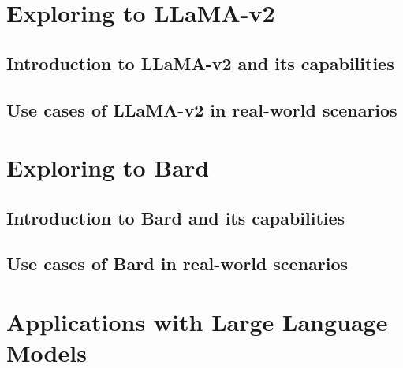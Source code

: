 \documentclass[
]{book}
\begin{document}
\hypertarget{exploring-to-llama-v2}{%
\chapter*{Exploring to LLaMA-v2}\label{exploring-to-llama-v2}}

\hypertarget{introduction-to-llama-v2-and-its-capabilities}{%
\section*{Introduction to LLaMA-v2 and its capabilities}\label{introduction-to-llama-v2-and-its-capabilities}}

\hypertarget{use-cases-of-llama-v2-in-real-world-scenarios}{%
\section*{Use cases of LLaMA-v2 in real-world scenarios}\label{use-cases-of-llama-v2-in-real-world-scenarios}}

\hypertarget{exploring-to-bard}{%
\chapter*{Exploring to Bard}\label{exploring-to-bard}}

\hypertarget{introduction-to-bard-and-its-capabilities}{%
\section*{Introduction to Bard and its capabilities}\label{introduction-to-bard-and-its-capabilities}}

\hypertarget{use-cases-of-bard-in-real-world-scenarios}{%
\section*{Use cases of Bard in real-world scenarios}\label{use-cases-of-bard-in-real-world-scenarios}}

\hypertarget{applications-with-large-language-models}{%
\chapter*{Applications with Large Language Models}\label{applications-with-large-language-models}}
\end{document}
